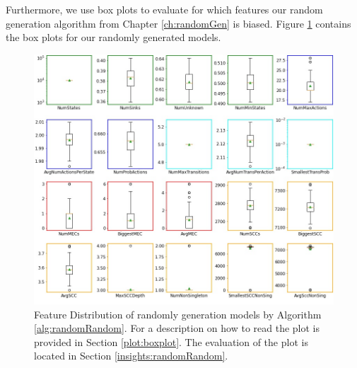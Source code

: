 Furthermore, we use box plots to evaluate for which features our random generation algorithm from Chapter \ref{ch:randomGen} is biased.
Figure \ref{fig:Random_FeatureDistribution} contains the box plots for our randomly generated models.
\begin{figure}[h!]
    \centering
    \includegraphics[width=1\textwidth]{figures/RandomRandom_FeatureDistribution.jpg}
    \caption[Feature Distribution of random models]{
        Feature Distribution of randomly generation models by Algorithm \ref{alg:randomRandom}. For a description on how to read the plot is provided in Section \ref{plot:boxplot}.
        The evaluation of the plot is located in Section \ref{insights:randomRandom}.
    }
    \label{fig:Random_FeatureDistribution}
\end{figure}
\FloatBarrier

